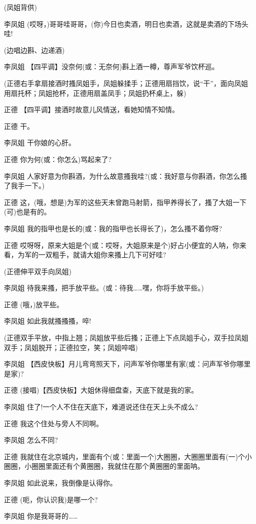 (凤姐背供)

李凤姐
(哎呀，)哥哥哇哥哥，(你)今日也卖酒，明日也卖酒，这就是卖酒的下场头哇!

(边唱边斟、边递酒)

李凤姐 【四平调】没奈何(或：无奈何)斟上酒一樽，尊声军爷饮杯巡。

(正德右手拿扇接酒时搔凤姐手，凤姐躲揉手；正德用扇挡饮，说``干''，面向凤姐用扇托杯；凤姐抢杯，正德用扇盖凤手；凤姐扔杯桌上，躲)

正德 【四平调】接酒时故意儿风情送，看她知情不知情。

正德 干。

李凤姐 干你娘的心肝。

正德 你为何(或：你怎么)骂起来了?

李凤姐
人家好意为你斟酒，为什么故意搔我哇?(或：我好意与你斟酒，你怎么搔了我手一下。)

正德
这，(哦，想是)为军的这些天未曾跑马射箭，指甲养得长了，搔了大姐一下(可)也是有的。

李凤姐 我的指甲也是长的(或：我的指甲也长得长了)，怎么搔不着你呀?

正德
哎呀呀，原来大姐是个(或：哎呀，大姐原来是个)好占小便宜的人呐，你来看，为军的一双粗手，就请大姐你来搔上几下可好哇?

(正德伸平双手向凤姐)

李凤姐
待我来搔，把手放平些。(或：待我\ldots{}\ldots{}嘿，你将手放平些。)

正德 (哦，)放平些。

李凤姐 如此我就搔搔搔，啐!

(正德双手平放，中指上翘；凤姐放平些后搔；正德上下点凤姐手心，双手拉凤姐双手；凤姐脱开；正德拉空，笑；凤姐啐唱)

李凤姐
【西皮快板】月儿弯弯照天下，问声军爷你哪里有家(或：问声军爷你哪里是家)?

正德 (接唱)【西皮快板】大姐休得细盘查，天底下就是我的家。

李凤姐 住了!一个人不住在天底下，难道说还住在天上头不成么?

正德 我这个住处与旁人不同啊。

李凤姐 怎么不同?

正德
我就住在北京城内，里面有个(或：里面一个)大圈圈，大圈圈里面有(一)个小圈圈，小圈圈里面还有个黄圈圈，我就住在那个黄圈圈的里面呐。

李凤姐 如此说来，我倒像是认得你。

正德 (呃，你认识我)是哪一个?

李凤姐 你是我哥哥的\ldots{}\ldots{}

